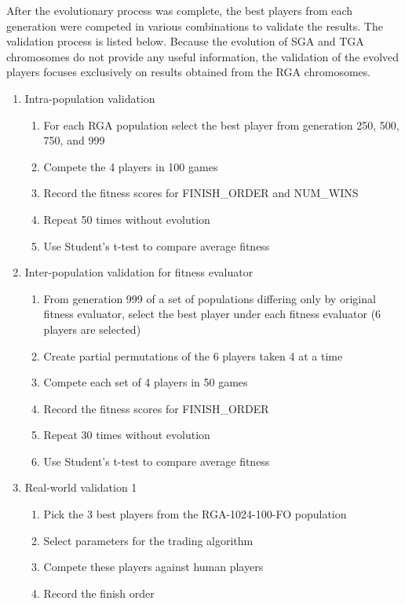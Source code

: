 After the evolutionary process was complete, the best players from each
generation were competed in various combinations to validate the results. The
validation process is listed below. Because the evolution of SGA and TGA
chromosomes do not provide any useful information, the validation of the evolved
players focuses exclusively on results obtained from the RGA chromosomes.

\begin{enumerate}
  \item {Intra-population validation}
  \begin{enumerate}
    \item {For each RGA population select the best player from generation 250,
    500, 750, and 999}
    \item {Compete the 4 players in 100 games}
    \item {Record the fitness scores for FINISH\_ORDER and NUM\_WINS}
    \item {Repeat 50 times without evolution}
    \item {Use Student's t-test to compare average fitness}
  \end{enumerate}
  \item {Inter-population validation for fitness evaluator}
  \begin{enumerate}
    \item {From generation 999 of a set of populations differing only by
    original fitness evaluator, select the best player under each fitness
    evaluator (6 players are selected)}
    \item {Create partial permutations of the 6 players taken 4 at a time}
    \item {Compete each set of 4 players in 50 games}
    \item {Record the fitness scores for FINISH\_ORDER}
    \item {Repeat 30 times without evolution}
    \item {Use Student's t-test to compare average fitness}
  \end {enumerate}
  \item {Real-world validation 1}
  \begin{enumerate}
    \item {Pick the 3 best players from the RGA-1024-100-FO population}
    \item {Select parameters for the trading algorithm}
    \item {Compete these players against human players}   
    \item {Record the finish order}

\end{enumerate}
\end{enumerate}
